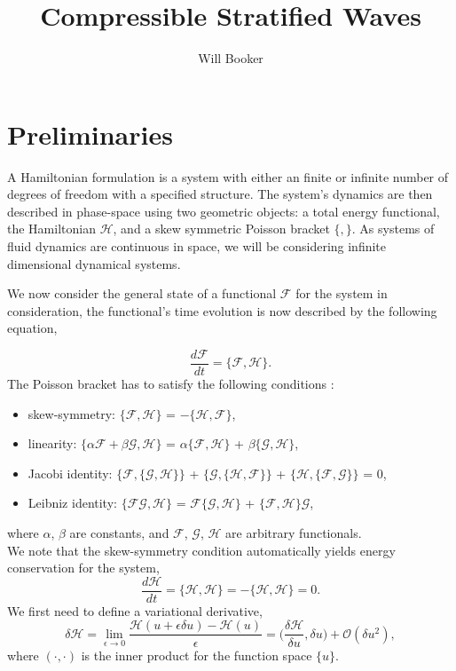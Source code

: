 \documentclass[a4paper,11pt]{article}
\author{Will Booker}
\title{Compressible Stratified Waves}
\begin{document}
\maketitle

\section{Preliminaries}


A Hamiltonian formulation is a system with either an finite or infinite number of degrees of freedom with a specified structure. The system's dynamics are then described in phase-space using two geometric objects: a total energy functional,  the Hamiltonian $\mathcal{H}$, and a skew symmetric Poisson bracket $\{ , \}$.
As systems of fluid dynamics are continuous in space, we will be considering infinite dimensional dynamical systems. 



 We now consider the general state of a functional $\mathcal{F}$ for  the system in consideration, the functional's time evolution is now described by the following equation,

\begin{equation}
 \frac{ d \mathcal{F}}{dt} =\{\mathcal{F},\mathcal{H}\} .
\end{equation}
The Poisson bracket has to satisfy the following conditions :

\begin{itemize}
\item skew-symmetry: $\{\mathcal{F},\mathcal{H}\}$ = $-\{\mathcal{H},\mathcal{F}\}$,
\item linearity: $\{\alpha \mathcal{F} + \beta \mathcal{G},\mathcal{H}\}$ = $\alpha \{\mathcal{F},\mathcal{H}\}$ + $\beta\{\mathcal{G},\mathcal{H}\}$,
\item Jacobi identity: $ \{\mathcal{F},\{\mathcal{G},\mathcal{H}\}\}$ + $ \{\mathcal{G},\{\mathcal{H},\mathcal{F}\}\}$ + $ \{\mathcal{H},\{\mathcal{F},\mathcal{G}\}\}$ = 0,
\item Leibniz identity:   $\{\mathcal{F}\mathcal{G},\mathcal{H}\}$ = $\mathcal{F}\{\mathcal{G},\mathcal{H}\}$ + $\{\mathcal{F},\mathcal{H}\}\mathcal{G}$,
\end{itemize}
where $\alpha$, $\beta$ are constants, and $\mathcal{F}$, $\mathcal{G}$, $\mathcal{H}$ are arbitrary functionals. \\
We  note that the skew-symmetry condition automatically yields energy conservation for the system,
\[\frac{d \mathcal{H}}{dt} = \{\mathcal{H},\mathcal{H}\}= -\{\mathcal{H},\mathcal{H}\} = 0.\]
We first  need to define a variational derivative, 
\begin{equation}\label{eqns:var_deriv}
\delta \mathcal{H} = \lim_{\epsilon \rightarrow 0}\frac{ \mathcal{H}( u+ \epsilon\delta u)-  \mathcal{H}(u)}{\epsilon}= \bigg ( \frac{\delta  \mathcal{H}}{\delta u}, \delta u \bigg)+  \mathcal{O}(\delta u^2),
\end{equation}
where $(\cdot,\cdot)$ is the inner product for the function space $\{ u\}$.
\end{document}

